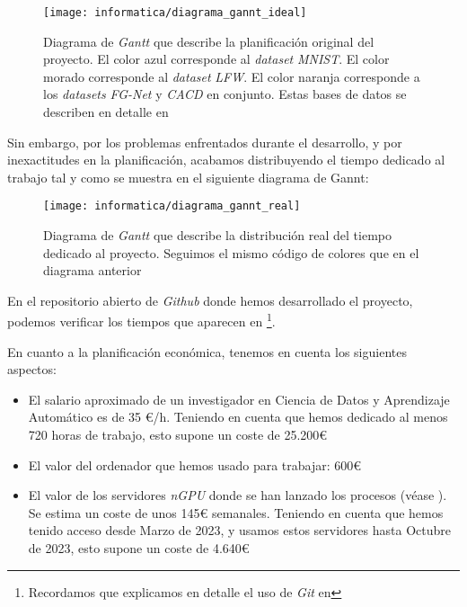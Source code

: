 \begin{figure}[H]
	\centering
	\texttt{[image: informatica/diagrama\_gannt\_ideal]}
	\caption{Diagrama de \textit{Gantt} que describe la planificación original del proyecto. El color azul corresponde al \textit{dataset} \textit{MNIST}. El color morado corresponde al \textit{dataset} \textit{LFW}. El color naranja corresponde a los \textit{datasets} \textit{FG-Net} y \textit{CACD} en conjunto. Estas bases de datos se describen en detalle en }
\end{figure}

Sin embargo, por los problemas enfrentados durante el desarrollo, y por inexactitudes en la planificación, acabamos distribuyendo el tiempo dedicado al trabajo tal y como se muestra en el siguiente diagrama de Gannt:

\begin{figure}[H]
	\centering
	\texttt{[image: informatica/diagrama\_gannt\_real]}
	\caption{Diagrama de \textit{Gantt} que describe la distribución real del tiempo dedicado al proyecto. Seguimos el mismo código de colores que en el diagrama anterior}
	\label{img:gannt_real}
\end{figure}

En el repositorio abierto de \textit{Github} \cite{informatica:repogithub} donde hemos desarrollado el proyecto, podemos verificar los tiempos que aparecen en  \footnote{Recordamos que explicamos en detalle el uso de \textit{Git} en }.

En cuanto a la planificación económica, tenemos en cuenta los siguientes aspectos:

\begin{itemize}
	\item El salario aproximado de un investigador en Ciencia de Datos y Aprendizaje Automático es de 35 €/h. Teniendo en cuenta que hemos dedicado al menos 720 horas de trabajo, esto supone un coste de 25.200€
	\item El valor del ordenador que hemos usado para trabajar: 600€
	\item El valor de los servidores \textit{nGPU} donde se han lanzado los procesos (véase ). Se estima un coste de unos 145€ semanales. Teniendo en cuenta que hemos tenido acceso desde Marzo de 2023, y usamos estos servidores hasta Octubre de 2023, esto supone un coste de 4.640€
\end{itemize}

